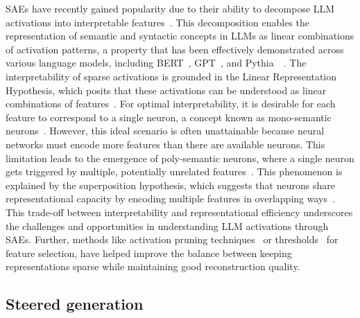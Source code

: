 SAEs have recently gained popularity due to their ability to decompose LLM activations into interpretable features~\cite{cunningham2023sparse}. This decomposition enables the representation of semantic and syntactic concepts in LLMs as linear combinations of activation patterns, a property that has been effectively demonstrated across various language models, including BERT~\cite{yun2021transformer}, GPT~\cite{sharkey2022taking}, and Pythia~\cite{cunningham2023sparse}~\cite{bloom2024open,marks2023some}. The interpretability of sparse activations is grounded in the Linear Representation Hypothesis, which posits that these activations can be understood as linear combinations of features~\cite{mikolov2013linguistic,nanda2023progress,park2023linear}. For optimal interpretability, it is desirable for each feature to correspond to a single neuron, a concept known as mono-semantic neurons~\cite{bau2020understanding,goh2021multimodal}. However, this ideal scenario is often unattainable because neural networks must encode more features than there are available neurons. This limitation leads to the emergence of poly-semantic neurons, where a single neuron gets triggered by multiple, potentially unrelated features~\cite{scherlis2022polysemanticity,mu2020compositional}. This phenomenon is explained by the superposition hypothesis, which suggests that neurons share representational capacity by encoding multiple features in overlapping ways~\cite{elhage2022toy}. This trade-off between interpretability and representational efficiency underscores the challenges and opportunities in understanding LLM activations through SAEs. Further, methods like activation pruning techniques~\cite{rajamanoharan2024jumping} or thresholds~\cite{rajamanoharan2024improving} for feature selection, have helped improve the balance between keeping representations sparse while maintaining good reconstruction quality. 




\par
\subsection{Steered generation}



